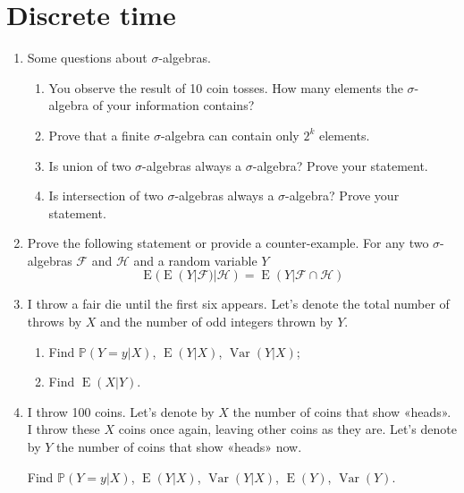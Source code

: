 \documentclass[12pt]{article}
\DeclareMathOperator{\Var}{Var}
\DeclareMathOperator{\E}{E}
\def \P{\mathbb{P}}
\begin{document}
\section{Discrete time}

\begin{enumerate}

\item Some questions about $\sigma$-algebras. 
\begin{enumerate}
  \item You observe the result of 10 coin tosses. How many elements the $\sigma$-algebra of your information contains?
  \item Prove that a finite $\sigma$-algebra can contain only $2^k$ elements.
  \item Is union of two $\sigma$-algebras always a $\sigma$-algebra? Prove your statement.
  \item Is intersection of two $\sigma$-algebras always a $\sigma$-algebra? Prove your statement.
\end{enumerate}

\item Prove the following statement or provide a counter-example.
For any two $\sigma$-algebras $\mathcal{F}$ and $\mathcal{H}$ and a random variable $Y$
\[
  \E(\E(Y|\mathcal F)|\mathcal H) = \E(Y|\mathcal F \cap \mathcal H)
\]

\item I throw a fair die until the first six appears. 
Let's denote the total number of throws by $X$ and the number of odd integers thrown by $Y$.

\begin{enumerate}
  \item Find $\P(Y=y|X)$, $\E(Y|X)$, $\Var(Y|X)$;
  \item Find $\E(X|Y)$.
\end{enumerate}

\item I throw 100 coins. Let's denote by $X$ the number of coins that show «heads».
I throw these $X$ coins once again, leaving other coins as they are. 
Let's denote by $Y$ the number of coins that show «heads» now.

Find $\P(Y=y|X)$, $\E(Y|X)$, $\Var(Y|X)$, $\E(Y)$, $\Var(Y)$.





\end{enumerate}
\end{document}
